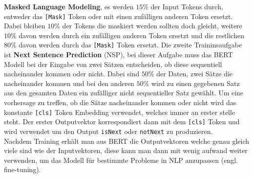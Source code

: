 \documentclass[12pt,letterpaper,ngerman]{article}
\begin{document}
{\bf Masked Language Modeling}, es werden $15\%$ der Input
Tokens durch, entweder das \verb|[Mask]| Token oder mit einen
zufälligen anderen Token ersetzt. Dabei bleiben 
$10\%$ der Tokens die maskiert werden sollten doch gleicht,
weitere $10\%$ davon werden durch ein zufälligen anderen Token
ersetzt und die restlichen $80\%$ davon werden durch
das \verb|[Mask]| Token ersetzt. Die zweite Traininsaufgabe
ist {\bf Next Sentence Prediction} (NSP), bei dieser Aufgabe
muss das BERT Modell bei der Eingabe von zwei Sätzen entscheiden,
ob diese sequentiell nacheinander kommen oder nicht. Dabei sind
$50\%$ der Daten, zwei Sätze die nacheinander kommen und
bei den anderen $50\%$ wird zu einen gegebenen Satz aus den gesamten
Daten ein zufälliger nicht sequentieller Satz gewählt. Um eine vorhersage zu
treffen,
ob die Sätze nacheinander kommen oder nicht wird das konstante \verb|[cls]|
Token Embedding verwendet, welches immer an erster stelle steht.
Der erster Outputvektor korrespondiert dann mit dem \verb|[cls]| Token und
wird verwendet um den Output \verb|isNext| oder \verb|notNext| zu produzieren.\\ 
Nachdem Training erhält man aus BERT die Outputvektoren welche genau gleich viele
sind wie der Inputvektoren, diese kann man dann mit wenig aufwand
weiter verwenden, um das Modell für bestimmte Probleme in NLP
anzupassen (engl. fine-tuning).
\end{document}
